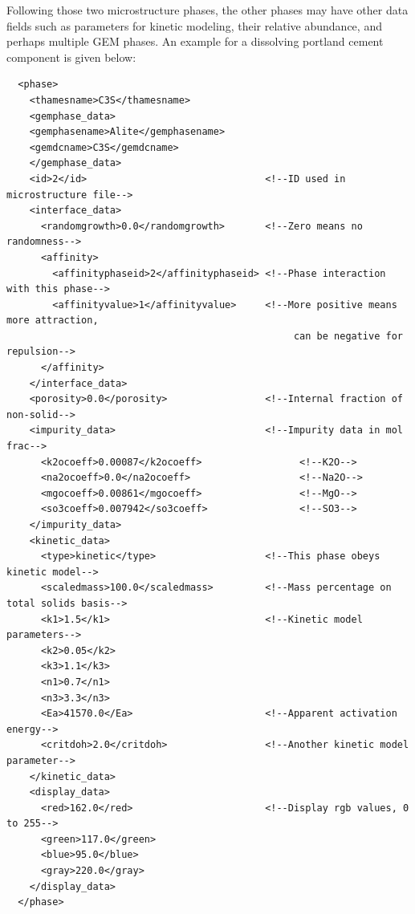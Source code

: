 \documentclass{article}
\begin{document}
Following those two microstructure phases, the other phases may have other data fields
such as parameters for kinetic modeling, their relative abundance, and perhaps
multiple GEM phases.  An example for a dissolving portland cement component is
given below:

\scriptsize{
    \begin{lstlisting}
  <phase>
    <thamesname>C3S</thamesname>
    <gemphase_data>
    <gemphasename>Alite</gemphasename>
    <gemdcname>C3S</gemdcname>
    </gemphase_data>
    <id>2</id>                               <!--ID used in microstructure file-->
    <interface_data>
      <randomgrowth>0.0</randomgrowth>       <!--Zero means no randomness-->
      <affinity>
        <affinityphaseid>2</affinityphaseid> <!--Phase interaction with this phase-->
        <affinityvalue>1</affinityvalue>     <!--More positive means more attraction,
                                                  can be negative for repulsion-->
      </affinity>
    </interface_data>
    <porosity>0.0</porosity>                 <!--Internal fraction of non-solid-->
    <impurity_data>                          <!--Impurity data in mol frac-->
      <k2ocoeff>0.00087</k2ocoeff>                 <!--K2O-->
      <na2ocoeff>0.0</na2ocoeff>                   <!--Na2O-->
      <mgocoeff>0.00861</mgocoeff>                 <!--MgO-->
      <so3coeff>0.007942</so3coeff>                <!--SO3-->
    </impurity_data>
    <kinetic_data>
      <type>kinetic</type>                   <!--This phase obeys kinetic model-->
      <scaledmass>100.0</scaledmass>         <!--Mass percentage on total solids basis-->
      <k1>1.5</k1>                           <!--Kinetic model parameters-->
      <k2>0.05</k2>
      <k3>1.1</k3>
      <n1>0.7</n1>
      <n3>3.3</n3>
      <Ea>41570.0</Ea>                       <!--Apparent activation energy-->
      <critdoh>2.0</critdoh>                 <!--Another kinetic model parameter-->
    </kinetic_data>
    <display_data>
      <red>162.0</red>                       <!--Display rgb values, 0 to 255-->
      <green>117.0</green>
      <blue>95.0</blue>
      <gray>220.0</gray>
    </display_data>
  </phase>
    \end{lstlisting}
}

\end{document}
